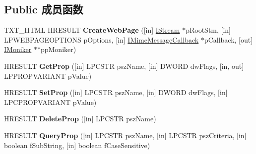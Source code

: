 \subsection*{Public 成员函数}
\begin{DoxyCompactItemize}
\item 
\mbox{\label{interface_m_i_m_e_o_l_e_1_1_i_mime_message_af4d8ab5c71419a034aa2dcf8f44e21dd}} 
T\+X\+T\+\_\+\+H\+T\+ML H\+R\+E\+S\+U\+LT {\bfseries Create\+Web\+Page} (\mbox{[}in\mbox{]} \hyperlink{interface_i_stream}{I\+Stream} $\ast$p\+Root\+Stm, \mbox{[}in\mbox{]} L\+P\+W\+E\+B\+P\+A\+G\+E\+O\+P\+T\+I\+O\+NS p\+Options, \mbox{[}in\mbox{]} \hyperlink{interface_m_i_m_e_o_l_e_1_1_i_mime_message_callback}{I\+Mime\+Message\+Callback} $\ast$p\+Callback, \mbox{[}out\mbox{]} \hyperlink{interface_i_moniker}{I\+Moniker} $\ast$$\ast$pp\+Moniker)
\item 
\mbox{\label{interface_m_i_m_e_o_l_e_1_1_i_mime_message_ae31e65fd3d51c3e852a0650facc0d83c}} 
H\+R\+E\+S\+U\+LT {\bfseries Get\+Prop} (\mbox{[}in\mbox{]} L\+P\+C\+S\+TR psz\+Name, \mbox{[}in\mbox{]} D\+W\+O\+RD dw\+Flags, \mbox{[}in, out\mbox{]} L\+P\+P\+R\+O\+P\+V\+A\+R\+I\+A\+NT p\+Value)
\item 
\mbox{\label{interface_m_i_m_e_o_l_e_1_1_i_mime_message_ad11296046a7dee18c6abbfb59cf43909}} 
H\+R\+E\+S\+U\+LT {\bfseries Set\+Prop} (\mbox{[}in\mbox{]} L\+P\+C\+S\+TR psz\+Name, \mbox{[}in\mbox{]} D\+W\+O\+RD dw\+Flags, \mbox{[}in\mbox{]} L\+P\+C\+P\+R\+O\+P\+V\+A\+R\+I\+A\+NT p\+Value)
\item 
\mbox{\label{interface_m_i_m_e_o_l_e_1_1_i_mime_message_aea5369e4c7d1e27e78377e36578c3e71}} 
H\+R\+E\+S\+U\+LT {\bfseries Delete\+Prop} (\mbox{[}in\mbox{]} L\+P\+C\+S\+TR psz\+Name)
\item 
\mbox{\label{interface_m_i_m_e_o_l_e_1_1_i_mime_message_a58a953afecd2ae10e1efec800f656467}} 
H\+R\+E\+S\+U\+LT {\bfseries Query\+Prop} (\mbox{[}in\mbox{]} L\+P\+C\+S\+TR psz\+Name, \mbox{[}in\mbox{]} L\+P\+C\+S\+TR psz\+Criteria, \mbox{[}in\mbox{]} boolean f\+Sub\+String, \mbox{[}in\mbox{]} boolean f\+Case\+Sensitive)
\item 
$$
\end{DoxyCompactItemize}
